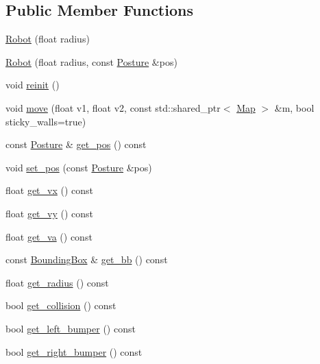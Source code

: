 \subsection*{Public Member Functions}
\begin{DoxyCompactItemize}
\item 
\hyperlink{classfastsim_1_1_robot_a86aa5cc648095704d1a925ebf17ed67d}{Robot} (float radius)
\item 
\hyperlink{classfastsim_1_1_robot_a6005063431a63ed6257a49245a6129f9}{Robot} (float radius, const \hyperlink{classfastsim_1_1_posture}{Posture} \&pos)
\item 
void \hyperlink{classfastsim_1_1_robot_a8f7d83b49391c427df939d44e842ca79}{reinit} ()
\item 
void \hyperlink{classfastsim_1_1_robot_a7be416fe089637594fd3f810a20ed42a}{move} (float v1, float v2, const std\+::shared\+\_\+ptr$<$ \hyperlink{classfastsim_1_1_map}{Map} $>$ \&m, bool sticky\+\_\+walls=true)
\item 
const \hyperlink{classfastsim_1_1_posture}{Posture} \& \hyperlink{classfastsim_1_1_robot_ae28a7d7dbbb1248086e634484e9ea184}{get\+\_\+pos} () const 
\item 
void \hyperlink{classfastsim_1_1_robot_a32f66a8d376565a1a6b41565f409aab4}{set\+\_\+pos} (const \hyperlink{classfastsim_1_1_posture}{Posture} \&pos)
\item 
float \hyperlink{classfastsim_1_1_robot_a13d799c21df39c79e03aa3d6406e3188}{get\+\_\+vx} () const 
\item 
float \hyperlink{classfastsim_1_1_robot_a2ba88c3bdec5ab399332e9f1ead10420}{get\+\_\+vy} () const 
\item 
float \hyperlink{classfastsim_1_1_robot_a4b4be51fb6b29b3deadd57579570a7bb}{get\+\_\+va} () const 
\item 
const \hyperlink{structfastsim_1_1_robot_1_1_bounding_box}{Bounding\+Box} \& \hyperlink{classfastsim_1_1_robot_a405fbb8a6c350659d4fc18dfed1bf674}{get\+\_\+bb} () const 
\item 
float \hyperlink{classfastsim_1_1_robot_ad9d99d7ab8cb32c3af2ec03eb025dc5c}{get\+\_\+radius} () const 
\item 
bool \hyperlink{classfastsim_1_1_robot_a64b3a51067d5f22947be2df03920448a}{get\+\_\+collision} () const 
\item 
bool \hyperlink{classfastsim_1_1_robot_a761ad491770318de8af76f87045636cd}{get\+\_\+left\+\_\+bumper} () const 
\item 
bool \hyperlink{classfastsim_1_1_robot_ae203ad2736bc4e5d08a2aba57260162c}{get\+\_\+right\+\_\+bumper} () const 

\end{DoxyCompactItemize}
